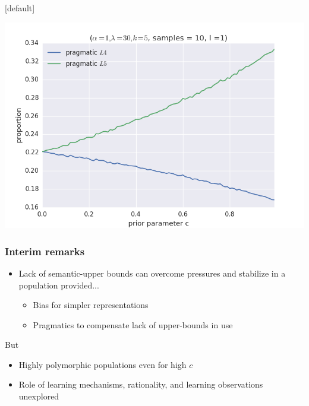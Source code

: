 \documentclass{beamer} %
\makeatletter
\newenvironment{withoutheadline}{
        \setbeamertemplate{headline}[default]
        \def\beamer@entrycode{\vspace*{-\headheight}}
    }{}
\makeatother
\begin{document}
\begin{withoutheadline}
\begin{frame}
\includegraphics[width=\linewidth,height=\textheight,keepaspectratio]{03cost-with-l1}

\end{frame}

\begin{frame}
  \frametitle{Interim remarks}
  \begin{itemize}
	\item Lack of semantic-upper bounds can overcome pressures and stabilize in a population provided...
	  \begin{itemize}
		\item Bias for simpler representations
		\item Pragmatics to compensate lack of upper-bounds in use
	  \end{itemize}
  \end{itemize}
  But

  \begin{itemize}
    \item Highly polymorphic populations even for high $c$
    \item Role of learning mechanisms, rationality, and learning observations unexplored
  \end{itemize}

\end{frame}


\end{withoutheadline}
\end{document}
